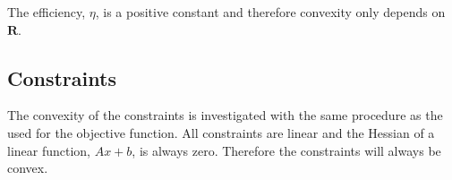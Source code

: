 %
%
%
%
%




The efficiency, $\eta$, is a positive constant and therefore convexity only depends on $\bm{R}$. 

\subsection{Constraints}

The convexity of the constraints is investigated with the same procedure as the used for the objective function. All constraints are linear and the Hessian of a linear function, $Ax+b$, is always zero. Therefore the constraints will always be convex.

